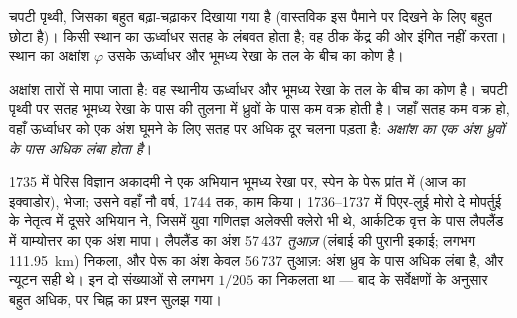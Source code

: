 \begin{omfigure}

{\small चपटी पृथ्वी, जिसका  बहुत बढ़ा-चढ़ाकर दिखाया गया है (वास्तविक 
इस पैमाने पर दिखने के लिए बहुत छोटा है)। किसी स्थान का ऊर्ध्वाधर सतह के लंबवत होता है;
वह ठीक केंद्र की ओर इंगित नहीं करता। स्थान का
अक्षांश $\varphi$ उसके ऊर्ध्वाधर और भूमध्य रेखा के तल के बीच का कोण है।}
\end{omfigure}

अक्षांश तारों से मापा जाता है: वह स्थानीय ऊर्ध्वाधर और भूमध्य रेखा के तल के बीच का कोण
है। चपटी पृथ्वी पर सतह भूमध्य रेखा के पास की तुलना में ध्रुवों के पास कम वक्र होती है।
जहाँ सतह कम वक्र हो, वहाँ ऊर्ध्वाधर को एक अंश घूमने के लिए सतह पर अधिक दूर चलना पड़ता
है: \emph{अक्षांश का एक अंश ध्रुवों के पास अधिक लंबा होता है}।

\begin{history}[लैपलैंड और पेरू]
1735 में पेरिस विज्ञान अकादमी ने एक अभियान भूमध्य रेखा पर, स्पेन के पेरू प्रांत में (आज का
इक्वाडोर), भेजा; उसने वहाँ नौ वर्ष, 1744 तक, काम किया। 1736--1737 में
पिएर-लुई मोरो दे मोपर्तुई के नेतृत्व में दूसरे अभियान ने, जिसमें युवा गणितज्ञ अलेक्सी क्लेरो
भी थे, आर्कटिक वृत्त के पास लैपलैंड में याम्योत्तर का एक अंश मापा। लैपलैंड का अंश
57\,437 \emph{तुआज़} (लंबाई की पुरानी इकाई; लगभग
\qty{111.95}{km}) निकला, और पेरू का अंश केवल 56\,737 तुआज़: अंश ध्रुव के पास अधिक
लंबा है, और न्यूटन सही थे। इन दो संख्याओं से लगभग $1/205$ का
 निकलता था --- बाद के सर्वेक्षणों के अनुसार बहुत अधिक, पर चिह्न का प्रश्न सुलझ
गया।
\end{history}

